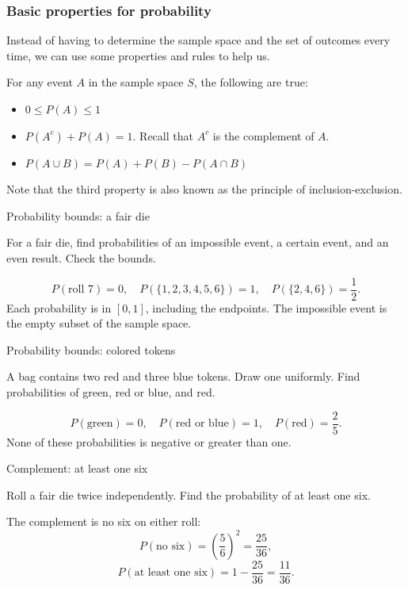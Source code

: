 \begin{frame}
\frametitle{Basic properties for probability}
Instead of having to determine the sample space and the set of outcomes every time, we can use some properties and rules to help us.
\begin{thm}{}{}
For any event $A$ in the sample space $S$, the following are true:
\begin{itemize}
\item $0 \leq P(A) \leq 1$  \pause
\item $P(A^c) + P(A) = 1$. Recall that $A^c$ is the complement of $A$. \pause
\item $P(A \cup B) = P(A) + P(B) - P(A \cap B)$
\end{itemize}
\end{thm}
Note that the third property is also known as the principle of inclusion-exclusion.
\end{frame}
\begin{frame}[t]{Probability bounds: a fair die}
\small
\begin{ex}
For a fair die, find probabilities of an impossible event, a certain event, and an even result. Check the bounds.
\end{ex}
\begin{sol}
\[P(\text{roll }7)=0,\quad P(\{1,2,3,4,5,6\})=1,\quad P(\{2,4,6\})=\frac12.\] Each probability is in $[0,1]$, including the endpoints. The impossible event is the empty subset of the sample space.
\end{sol}
\end{frame}

\begin{frame}[t]{Probability bounds: colored tokens}
\small
\begin{ex}
A bag contains two red and three blue tokens. Draw one uniformly. Find probabilities of green, red or blue, and red.
\end{ex}
\begin{sol}
\[P(\text{green})=0,\quad P(\text{red or blue})=1,\quad P(\text{red})=\frac25.\] None of these probabilities is negative or greater than one.
\end{sol}
\end{frame}

\begin{frame}[t]{Complement: at least one six}
\small
\begin{ex}
Roll a fair die twice independently. Find the probability of at least one six.
\end{ex}
\begin{sol}
The complement is no six on either roll:\[P(\text{no six})=\left(\frac56\right)^2=\frac{25}{36},\]\[P(\text{at least one six})=1-\frac{25}{36}=\frac{11}{36}.\]
\end{sol}
\end{frame}

